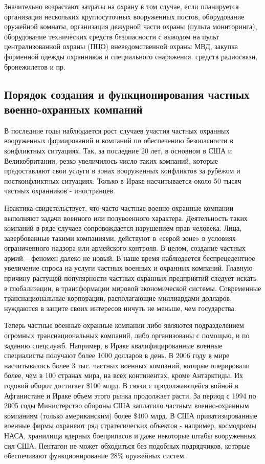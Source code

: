 \documentclass[a4paper,12pt,fleqn]{article} %
\begin{document}
Значительно возрастают затраты на охрану в том случае, если планируется организация нескольких круглосуточных вооруженных постов, оборудование оружейной комнаты, организация дежурной части охраны (пульта мониторинга), оборудование технических средств безопасности с выводом на пульт централизованной охраны (ПЦО) вневедомственной охраны МВД, закупка форменной одежды охранников и специального снаряжения, средств радиосвязи, бронежилетов и пр.

\subsection{Порядок создания и функционирования частных военно-охранных компаний}

В последние годы наблюдается рост случаев участия частных охранных вооруженных формирований и компаний по обеспечению безопасности в конфликтных ситуациях. Так, за последние 20 лет, в основном в США и Великобритании, резко увеличилось число таких компаний, которые предоставляют свои услуги в зонах вооруженных конфликтов за рубежом и постконфликтных ситуациях. Только в Ираке насчитывается около 50 тысяч частных охранников - иностранцев.
	
Практика свидетельствует, что часто частные военно-охранные компании выполняют задачи военного или полувоенного характера. Деятельность таких компаний в ряде случаев сопровождается нарушением прав человека. Лица, завербованные такими компаниями, действуют в «серой зоне» в условиях ограниченного надзора или армейского контроля. В целом, создание частных армий – феномен далеко не новый. В наше время наблюдается беспрецедентное увеличение спроса на услуги частных военных и охранных компаний. Главную причину растущей популярности частных охранных предприятий следует искать в глобализации, в трансформации мировой экономической системы. Современные транснациональные корпорации, располагающие миллиардами долларов, нуждаются в защите своих интересов ничуть не меньше, чем государства.  

Теперь частные военные охранные компании либо являются подразделением огромных транснациональных компаний, либо организованы с помощью, и по заданию спецслужб. Например, в Ираке квалифицированные военные специалисты получают более 1000 долларов в день. В 2006 году в мире насчитывалось более 3 тыс. частных военных компаний, которые оперировали более, чем в 100 странах мира, на всех континентах, кроме Антарктиды. Их годовой оборот достигает \$100 млрд. В связи с продолжающейся войной в Афганистане и Ираке объем этого рынка продолжает расти. За период с 1994 по 2005 годы Министерство обороны США заплатило частным военно-охранным компаниям (только американским) более \$400 млрд. В США приватизированные военные фирмы охраняют ряд стратегических объектов - например, космодромы НАСА, хранилища ядерных боеприпасов и даже некоторые штабы вооруженных сил США. Пентагон не может обходиться без подобных подрядчиков, которые обеспечивают функционирование 28\% оружейных систем. 
\end{document}
